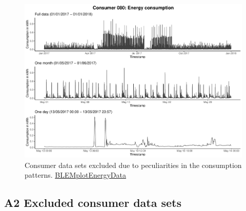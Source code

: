 \begin{centering}
\begin{figure}[!htbp]
        \includegraphics[width=\textwidth-0.85cm]{thesis/graphs/timeseries/c080_cons.pdf}
        \caption[Consumer data sets excluded due to peculiarities in the consumption patterns]{Consumer data sets excluded due to peculiarities in the consumption patterns. \quantnet\href{ }{BLEMplotEnergyData}}
\end{figure}
\end{centering}


\subsection*{\hypertarget{AppA2:Figures:Excludedp}{A2} Excluded consumer data sets}\label{AppA2:Figures:Excludedp}

